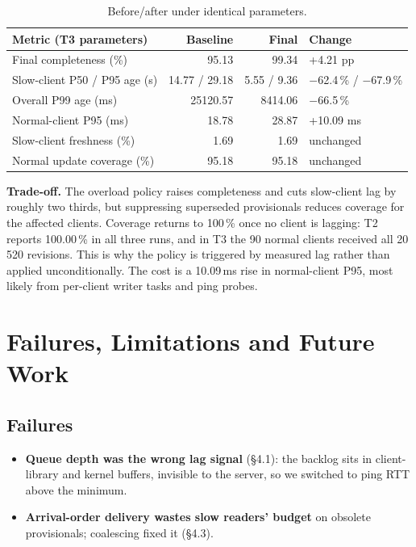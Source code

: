 \documentclass[11pt,a4paper]{article}
\begin{document}
\begin{table}[h]
\centering\small
\begin{tabular}{@{}lrrl@{}}
\toprule
\textbf{Metric (T3 parameters)} & \textbf{Baseline} & \textbf{Final} & \textbf{Change} \\
\midrule
Final completeness (\%)              & 95.13   & 99.34   & +4.21 pp \\
Slow-client P50 / P95 age (s)        & 14.77 / 29.18 & 5.55 / 9.36 & $-$62.4\,\% / $-$67.9\,\% \\
Overall P99 age (ms)                 & 25120.57   & 8414.06    & $-$66.5\,\% \\
Normal-client P95 (ms)               & 18.78    & 28.87    & +10.09 ms \\
Slow-client freshness (\%)           & 1.69    & 1.69    & unchanged \\
Normal update coverage (\%)          & 95.18   & 95.18   & unchanged \\
\bottomrule
\end{tabular}
\caption{Before/after under identical parameters.}
\end{table}

\textbf{Trade-off.} The overload policy raises completeness and cuts slow-client
lag by roughly two thirds, but suppressing superseded provisionals reduces
coverage for the affected clients. Coverage returns to 100\,\% once no client is
lagging: T2 reports 100.00\,\% in all three runs, and in T3 the 90 normal clients
received all 20\,520 revisions. This is why the policy is triggered by measured
lag rather than applied unconditionally. The cost is a 10.09\,ms rise in
normal-client P95, most likely from per-client writer tasks and ping probes.


\section{Failures, Limitations and Future Work}
\label{sec:limits}

\subsection{Failures}

\begin{itemize}
\item \textbf{Queue depth was the wrong lag signal} (\S4.1): the backlog sits
      in client-library and kernel buffers, invisible to the server, so we
      switched to ping RTT above the minimum.
\item \textbf{Arrival-order delivery wastes slow readers' budget} on obsolete
      provisionals; coalescing fixed it (\S4.3).
\end{itemize}
\end{document}
